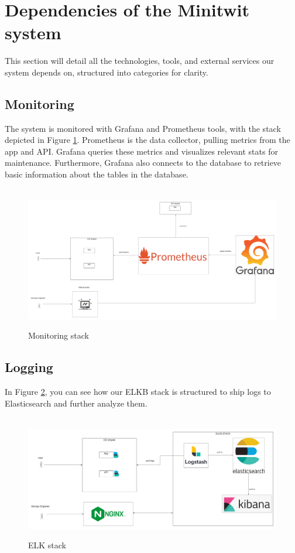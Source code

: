 \documentclass[12pt, a4paper, oneside]{book}
\begin{document}
\section{Dependencies of the Minitwit system}

This section will detail all the technologies, tools, and external services our system depends on, structured into categories for clarity.

\subsection{Monitoring}\label{sec:monitoring-architecture}
The system is monitored with Grafana and Prometheus tools, with the stack depicted in Figure \ref{fig:monitoring-stack}.
Prometheus is the data collector, pulling metrics from the app and API.
Grafana queries these metrics and visualizes relevant stats for maintenance.
Furthermore, Grafana also connects to the database to retrieve basic information about the tables in the database.

\begin{figure}[H]
    \centering
    \hbox{\hspace{-5em}
    \includegraphics[scale = 0.3]{images/grafana.png}}
    \caption{Monitoring stack}
    \label{fig:monitoring-stack}
\end{figure}

\subsection{Logging}\label{sec:logging-architecture}

In Figure \ref{fig:elk-stack}, you can see how our ELKB stack is structured to ship logs to Elasticsearch and further analyze them.
\begin{figure}[H]
    \centering
    \hbox{\hspace{-6em}
    \includegraphics[scale = 0.37]{images/elk.png}}
    \caption{ELK stack}
    \label{fig:elk-stack}
\end{figure}
\end{document}

